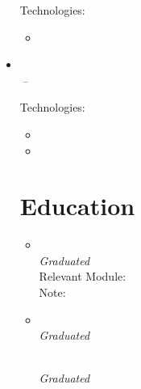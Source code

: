 \documentclass[11pt,a4paper]{article}
\begin{document}
\begin{itemize}[leftmargin=0pt,label={},itemsep=2em,topsep=0pt]
\vspace{0.2cm}
{\color{secondary}Technologies:} \HSBCTechnology
\vspace{0.3cm}
\begin{itemize}[leftmargin=*,topsep=-6pt,parsep=0pt,partopsep=0pt,itemsep=0pt]
    \item \HSBCShort
\end{itemize}


\item \parbox{\textwidth}{\textbf{\LloydsName} \hfill \textit{\LloydsLocation}}\\
\textit{\LloydsJobTitle} \hfill \textit{\LloydsJobStart\,--\,\LloydsJobEnd}

\vspace{0.2cm}
{\color{secondary}Technologies:} \LloydsTechnology
\vspace{0.3cm}
\begin{itemize}[leftmargin=*,topsep=-6pt,parsep=0pt,partopsep=0pt,itemsep=0pt]
    \item \LloydsShort
    \item \LloydsVB
\end{itemize}



\vspace{0.5cm}
\section{Education}
\begin{itemize}[leftmargin=0pt,label={},itemsep=2em]
\item \parbox{\textwidth}{\textbf{\MasterUniversity} \hfill \textit{\MasterLocation}}\\
\textit{\MasterCourse} \hfill \textit{Graduated \MasterGraduation}\\[4pt]
{\color{secondary}Relevant Module:} \textit{\MastersNotableDotNetModule}\\
{\color{secondary}Note:} \textit{\MastersNotableAchievement}

\item \parbox{\textwidth}{\textbf{\BatchelorsUniversity} \hfill \textit{\BatchelorsLocation}}\\
\textit{\BatchelorsCourse} \hfill \textit{Graduated \BatchelorsGraduation}
\parbox{\textwidth}{\textbf{\HEAOHogeschool} \hfill \textit{\HEAOsLocation}}\\
\textit{\HEAOCourse} \hfill \textit{Graduated \BatchelorsGraduation}
\end{itemize}




\end{itemize}
\end{document}

